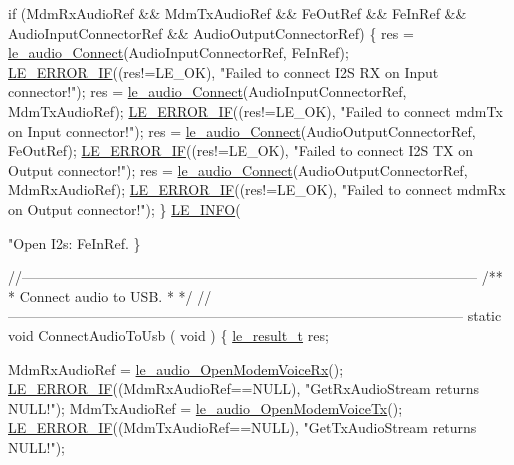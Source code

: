 \begin{DoxyCodeInclude}
{{{{{{{{{{    \textcolor{keywordflow}{if} (MdmRxAudioRef && MdmTxAudioRef && FeOutRef && FeInRef &&
        AudioInputConnectorRef && AudioOutputConnectorRef)
    \{
        res = \hyperlink{le__audio__interface_8h_a338df65b2fb1ae0140d86880adbcf0de}{le\_audio\_Connect}(AudioInputConnectorRef, FeInRef);
        \hyperlink{le__log_8h_aceaf11a11691d6c676e36dd317b38dbd}{LE\_ERROR\_IF}((res!=LE\_OK), \textcolor{stringliteral}{"Failed to connect I2S RX on Input connector!"});
        res = \hyperlink{le__audio__interface_8h_a338df65b2fb1ae0140d86880adbcf0de}{le\_audio\_Connect}(AudioInputConnectorRef, MdmTxAudioRef);
        \hyperlink{le__log_8h_aceaf11a11691d6c676e36dd317b38dbd}{LE\_ERROR\_IF}((res!=LE\_OK), \textcolor{stringliteral}{"Failed to connect mdmTx on Input connector!"});
        res = \hyperlink{le__audio__interface_8h_a338df65b2fb1ae0140d86880adbcf0de}{le\_audio\_Connect}(AudioOutputConnectorRef, FeOutRef);
        \hyperlink{le__log_8h_aceaf11a11691d6c676e36dd317b38dbd}{LE\_ERROR\_IF}((res!=LE\_OK), \textcolor{stringliteral}{"Failed to connect I2S TX on Output connector!"});
        res = \hyperlink{le__audio__interface_8h_a338df65b2fb1ae0140d86880adbcf0de}{le\_audio\_Connect}(AudioOutputConnectorRef, MdmRxAudioRef);
        \hyperlink{le__log_8h_aceaf11a11691d6c676e36dd317b38dbd}{LE\_ERROR\_IF}((res!=LE\_OK), \textcolor{stringliteral}{"Failed to connect mdmRx on Output connector!"});
    \}
    \hyperlink{le__log_8h_a23e6d206faa64f612045d688cdde5808}{LE\_INFO}(\textcolor{stringliteral}{"Open I2s: FeInRef.%
\}

\textcolor{comment}{//--------------------------------------------------------------------------------------------------}\textcolor{comment}{}
\textcolor{comment}{/**}
\textcolor{comment}{ * Connect audio to USB.}
\textcolor{comment}{ *}
\textcolor{comment}{ */}
\textcolor{comment}{//--------------------------------------------------------------------------------------------------}
\textcolor{keyword}{static} \textcolor{keywordtype}{void} ConnectAudioToUsb
(
    \textcolor{keywordtype}{void}
)
\{
    \hyperlink{le__basics_8h_a1cca095ed6ebab24b57a636382a6c86c}{le\_result\_t} res;

    MdmRxAudioRef = \hyperlink{le__audio__interface_8h_ae3ed568ba4d2763ea77e17e77b20ff02}{le\_audio\_OpenModemVoiceRx}();
    \hyperlink{le__log_8h_aceaf11a11691d6c676e36dd317b38dbd}{LE\_ERROR\_IF}((MdmRxAudioRef==NULL), \textcolor{stringliteral}{"GetRxAudioStream returns NULL!"});
    MdmTxAudioRef = \hyperlink{le__audio__interface_8h_ad745f008bb04873c817da7af3daf783d}{le\_audio\_OpenModemVoiceTx}();
    \hyperlink{le__log_8h_aceaf11a11691d6c676e36dd317b38dbd}{LE\_ERROR\_IF}((MdmTxAudioRef==NULL), \textcolor{stringliteral}{"GetTxAudioStream returns NULL!"});

}}}}}}}}}}}
\end{DoxyCodeInclude}
